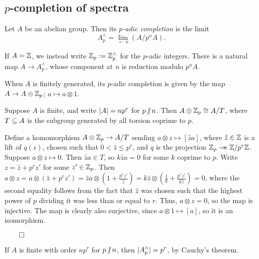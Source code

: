 \documentclass{MetricNotes2023}
\newcommand{\surj}{\rightarrow\mathrel{\mkern-14mu}\rightarrow}
\def\subq{\ensuremath\subseteq}
\def\inte{\ensuremath\mathbb{Z}}
\def\done{\begin{flushright}\vspace{-4.35ex}\(\qed\)\end{flushright}}
\def\nvert{\ensuremath\hspace{-0.5ex}\not\vert\hspace{0.5ex}}
\begin{document}
\subsection{\(p\)-completion of spectra}\label{2504291246}

\begin{definition}
Let \(A\) be an abelian group. Then its \textit{\(p\)-adic completion} is the limit 
\[A^\wedge_p=\lim\limits_{\leftarrow n} (A/p^nA).\]
\end{definition}

If \(A=\inte\), we instead write \(\inte_p := \inte_p^\wedge\) for the \(p\)-adic integers. There is a natural map \(A \to A^\wedge_p\), whose component at \(n\) is reduction modulo \(p^nA\). 

When \(A\) is finitely generated, its \(p\)-adic completion is given by the map \(A \to A\otimes \inte_p\); \(a\mapsto a\otimes 1\). 

\begin{lemma}\label{2504031247}
Suppose \(A\) is finite, and write \(\lvert A\rvert=np^r\) for \(p\nvert n\). Then \(A\otimes\inte_p\cong A/T\), where \(T\subq A\) is the subgroup generated by all torsion coprime to \(p\).
\end{lemma}

\begin{ourproof}
Define a homomorphism \(A\otimes\inte_p\to A/T\) sending \(a\otimes z \mapsto [\hat za]\), where \(\hat z\in \inte\) is a lift of \(q(z)\), chosen such that \(0 < \hat z \leq p^{r}\), and \(q\) is the projection \(\inte_p \surj \inte/p^r\inte\). Suppose \(a\otimes z\mapsto 0\).  Then \(\hat za\in T\), so \(k\hat za=0\) for some \(k\) coprime to \(p\). Write \(z=\hat z + p^rz'\) for some \(z'\in\inte_p\). Then \(a\otimes z = a\otimes(\hat z + p^r z')=\hat za\otimes(1 + \frac{p^rz'}{\hat z})=k\hat z\otimes(\frac{1}{k}+\frac{p^rz'}{k\hat z})=0\), where the second  equality follows from the fact that \(\hat z\) was chosen such that the highest power of \(p\) dividing it was less than or equal to \(r\).%
\text{ }Thus, \(a\otimes z = 0\), so the map is injective. The map is clearly also surjective, since \(a\otimes 1 \mapsto [a]\), so it is an isomorphism. \done
\end{ourproof}

\begin{remark}
If \(A\) is finite with order \(np^r\) for \(p\nvert n\), then \(\lvert A^\wedge_p\rvert=p^r\), by Cauchy's theorem. 
\end{remark}
\end{document}
